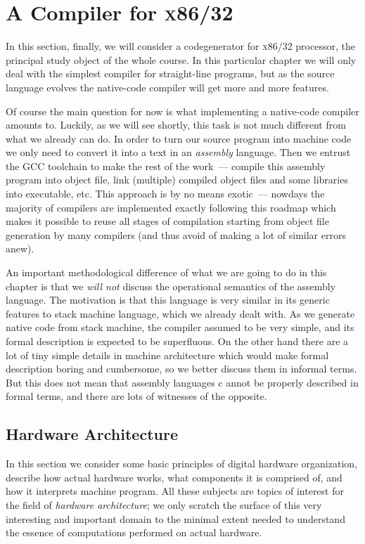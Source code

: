 \chapter{A Compiler for \textsc{x86/32}}

In this section, finally, we will consider a codegenerator for \textsc{x86/32} processor, the principal study
object of the whole course. In this particular chapter we will only deal with the simplest compiler for
straight-line programs, but as the source language evolves the native-code compiler will get more
and more features.

Of course the main question for now is what implementing a native-code compiler amounts to. Luckily, as we will
see shortly, this task is not much different from what we already can do. In order to turn our source program
into machine code we only need to convert it into a text in an \emph{assembly} language. Then we entrust
the \textsc{GCC} toolchain to make the rest of the work~--- compile this assembly program into object file,
link (multiple) compiled object files and some libraries into executable, etc. This approach is by no means
exotic~--- nowdays the majority of compilers are implemented exactly following this roadmap which makes it
possible to reuse all stages of compilation starting from object file generation by many compilers (and thus
avoid of making a lot of similar errors anew).

An important methodological difference of what we are going to do in this chapter is that we \emph{will not}
discuss the operational semantics of the assembly language. The motivation is that this language is very similar
in its generic features to stack machine language, which we already dealt with. As we generate native code from
stack machine, the compiler assumed to be very simple, and its formal description is expected to be superfluous.
On the other hand there are a lot of tiny simple details in machine architecture which would make formal description
boring and cumbersome, so we better discuss them in informal terms. But this does not mean that assembly languages c
annot be properly described in formal terms, and there are lots of witnesses of the opposite.

\section{Hardware Architecture}

In this section we consider some basic principles of digital hardware organization, describe how actual hardware works,
what components it is comprised of, and how it interprets machine program. All these subjects are topics of interest
for the field of \emph{hardware architecture}; we only scratch the surface of this very interesting and important
domain to the minimal extent needed to understand the essence of computations performed on actual hardware.


